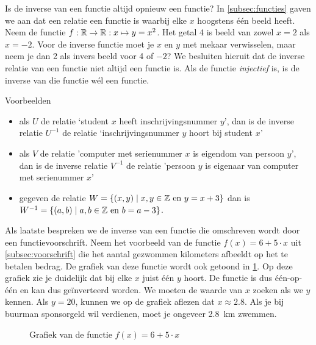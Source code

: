 Is de inverse van een functie altijd opnieuw een functie?  In \cref{subsec:functies} gaven we aan dat een relatie een functie is waarbij elke $x$ hoogstens één beeld heeft. Neem de functie $f:\mathbb{R}\to\mathbb{R}:x\mapsto y= x^2$. Het getal \num{4} is beeld van zowel $x=2$ als $x=-2$. Voor de inverse functie moet je $x$ en $y$ met mekaar verwisselen, maar neem je dan 2 als invers beeld voor 4 of $-2$? We besluiten hieruit dat de inverse relatie van een functie niet altijd een functie is. Als de functie \emph{injectief} is, is de inverse van die functie wél een functie. 

Voorbeelden
\begin{itemize}
\item als $U$ de relatie `student $x$ heeft inschrijvingsnummer $y$', dan is de inverse relatie $U^{-1}$ de relatie `inschrijvingsnummer $y$ hoort bij student $x$'
\item als $V$ de relatie 'computer met serienummer $x$ is eigendom van persoon $y$', dan is de inverse relatie $V^{-1}$ de relatie 'persoon $y$ is eigenaar van computer met serienummer $x$'
\item gegeven de relatie $W=\{(x,y)\mid x,y\in \mathbb{Z} \mathrm{~en~} y=x+3\}$ dan is $W^{-1}=\{(a,b)\mid a,b\in \mathbb{Z} \mathrm{~en~} b=a-3\}$.
\end{itemize}




Als laatste bespreken we de inverse van een functie die omschreven wordt door een functievoorschrift. 
Neem het voorbeeld van de functie $f(x)=6+5\cdot x$ uit \cref{subsec:voorschrift} die het aantal gezwommen kilometers afbeeldt op het te betalen bedrag. De grafiek van deze functie wordt ook getoond in \cref{fig:fotos}. Op deze grafiek zie je duidelijk dat bij elke $x$ juist \'e\'en $y$ hoort. De functie is dus \'e\'en-op-\'e\'en en kan dus ge\"inverteerd worden. We moeten  de waarde van $x$ zoeken als we $y$ kennen. Als $y=20$, kunnen we op de grafiek aflezen dat $x\approx \num{2.8}$. Als je bij buurman  sponsorgeld wil verdienen, moet je ongeveer \SI{2.8}{\kilo\meter} zwemmen. 

\begin{figure}[htbp]
\centering
{}
\caption{Grafiek van de functie $f(x)=6+5\cdot x$ }
\label{fig:fotos}
\end{figure}


